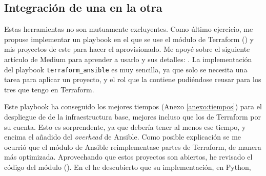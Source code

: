 \documentclass[11pt]{article}
\begin{document}
\begin{flushleft}
\clearpage
\subsection{Integración de una en la otra}
Estas herramientas no son mutuamente excluyentes. Como último ejercicio, me propuse implementar un playbook en el que se use el módulo de Terraform (\cite{terraform_ansible}) y mis proyectos de este para hacer el aprovisionado. Me apoyé sobre el siguiente artículo de Medium para aprender a usarlo y sus detalles: \cite{terraform_ansible_medium}. La implementación del playbook \texttt{terraform\_ansible} es muy sencilla, ya que solo se necesita una tarea para aplicar un proyecto, y el rol que la contiene pudiéndose reusar para los tres que tengo en Terraform.
\linebreak

\bigskip
        
        \begin{minipage}{.46\textwidth}
            Este playbook ha conseguido los mejores tiempos (Anexo \ref{anexo:tiempos}) para el despliegue de de la infraestructura base, mejores incluso que los de Terraform por su cuenta. Esto es sorprendente, ya que debería tener al menos ese tiempo, y encima el añadido del \textit{\gls{overhead}} de Ansible. Como posible explicación se me ocurrió que el módulo de Ansible reimplementase partes de Terraform, de manera más optimizada. Aprovechando que estos proyectos son abiertos, he revisado el código del módulo (\cite{terraform_ansible_module}). En el he descubierto que su implementación, en Python,
            \linebreak
            
        \end{minipage}%
        \hspace{1.5cm}
        \begin{minipage}{.41\textwidth}
            \inputminted[fontsize=\scriptsize, firstline=25, lastline=34, linenos, frame=single, breaklines]{yaml}{../../ansible/terraform_ansible/terraform/main.yml}
            \vspace{-.4cm}
            \vspace{.4cm}
            
        \end{minipage}
        \vspace{-.25cm}
        

\end{flushleft}
\end{document}
